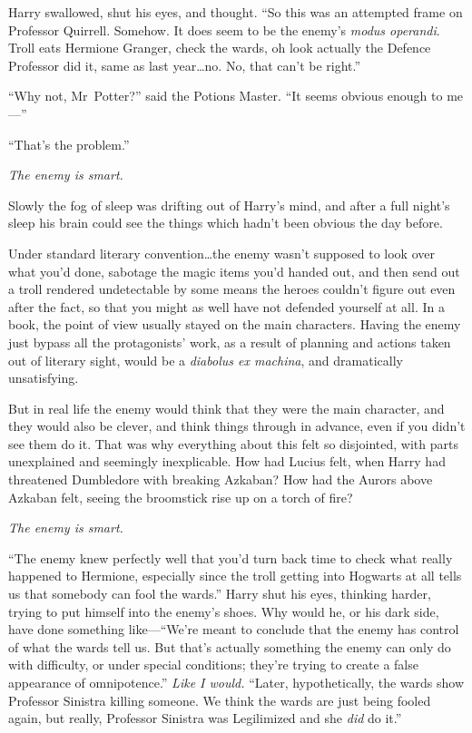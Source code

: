 Harry swallowed, shut his eyes, and thought. “So this was an attempted frame on Professor Quirrell. Somehow. It does seem to be the enemy’s \emph{modus operandi}. Troll eats Hermione Granger, check the wards, oh look actually the Defence Professor did it, same as last year…no. No, that can’t be right.”

“Why not, Mr~Potter?” said the Potions Master. “It seems obvious enough to me—”

“That’s the problem.”

\emph{The enemy is smart.}

Slowly the fog of sleep was drifting out of Harry’s mind, and after a full night’s sleep his brain could see the things which hadn’t been obvious the day before.

Under standard literary convention…the enemy wasn’t supposed to look over what you’d done, sabotage the magic items you’d handed out, and then send out a troll rendered undetectable by some means the heroes couldn’t figure out even after the fact, so that you might as well have not defended yourself at all. In a book, the point of view usually stayed on the main characters. Having the enemy just bypass all the protagonists’ work, as a result of planning and actions taken out of literary sight, would be a \emph{diabolus ex machina}, and dramatically unsatisfying.

But in real life the enemy would think that they were the main character, and they would also be clever, and think things through in advance, even if you didn’t see them do it. That was why everything about this felt so disjointed, with parts unexplained and seemingly inexplicable. How had Lucius felt, when Harry had threatened Dumbledore with breaking Azkaban? How had the Aurors above Azkaban felt, seeing the broomstick rise up on a torch of fire?

\emph{The enemy is smart.}

“The enemy knew perfectly well that you’d turn back time to check what really happened to Hermione, especially since the troll getting into Hogwarts at all tells us that somebody can fool the wards.” Harry shut his eyes, thinking harder, trying to put himself into the enemy’s shoes. Why would he, or his dark side, have done something like—“We’re meant to conclude that the enemy has control of what the wards tell us. But that’s actually something the enemy can only do with difficulty, or under special conditions; they’re trying to create a false appearance of omnipotence.” \emph{Like I would.} “Later, hypothetically, the wards show Professor Sinistra killing someone. We think the wards are just being fooled again, but really, Professor Sinistra was Legilimized and she \emph{did} do it.”

